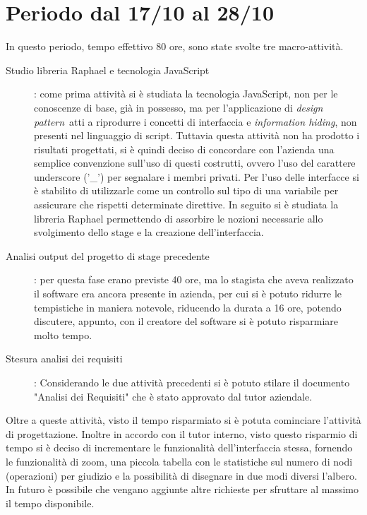 \section{Periodo dal 17/10 al 28/10}
In questo periodo, tempo effettivo 80 ore, sono state svolte tre macro-attività.
\begin{description}
\item[Studio libreria Raphael e tecnologia JavaScript]: come prima attività si è studiata la tecnologia JavaScript, non per le conoscenze di base, già in possesso, ma per l'applicazione di \textit{design pattern}\ atti a riprodurre i concetti di interfaccia e \textit{information hiding}, non presenti nel linguaggio di script. Tuttavia questa attività non ha prodotto i risultati progettati, si è quindi deciso di concordare con l'azienda una semplice convenzione sull'uso di questi costrutti, ovvero l'uso del carattere underscore ('\_') per segnalare i membri privati. Per l'uso delle interfacce si è stabilito di utilizzarle come un controllo sul tipo di una variabile per assicurare che rispetti determinate direttive. In seguito si è studiata la libreria Raphael permettendo di assorbire le nozioni necessarie allo svolgimento dello stage e la creazione dell'interfaccia.
\item[Analisi output del progetto di stage precedente]: per questa fase erano previste 40 ore, ma lo stagista che aveva realizzato il software era ancora presente in azienda, per cui si è potuto ridurre le tempistiche in maniera notevole, riducendo la durata a 16 ore, potendo discutere, appunto, con il creatore del software si è potuto risparmiare molto tempo.
\item[Stesura analisi dei requisiti]: Considerando le due attività precedenti si è potuto stilare il documento "Analisi dei Requisiti" che è stato approvato dal tutor aziendale.
\end{description}
Oltre a queste attività, visto il tempo risparmiato si è potuta cominciare l'attività di progettazione. Inoltre in accordo con il tutor interno, visto questo risparmio di tempo si è deciso di incrementare le funzionalità dell'interfaccia stessa, fornendo le funzionalità di zoom, una piccola tabella con le statistiche sul numero di nodi (operazioni) per giudizio e la possibilità di disegnare in due modi diversi l'albero. In futuro è possibile che vengano aggiunte altre richieste per sfruttare al massimo il tempo disponibile.

